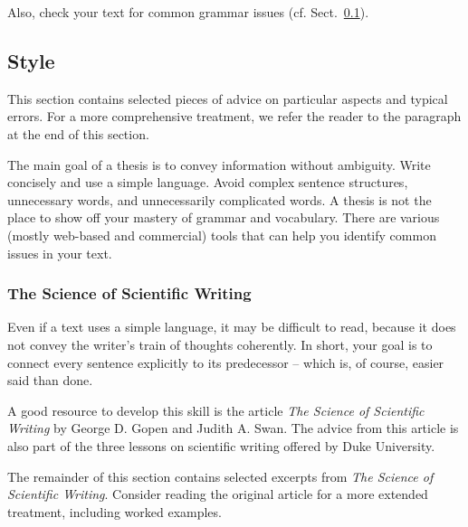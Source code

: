 Also, check your text for common grammar issues (cf. Sect.~\ref{sec:style}).

\subsection{Style}
\label{sec:style}

This section contains selected pieces of advice on particular aspects and typical errors. For a more comprehensive treatment, we refer the reader to the paragraph  at the end of this section.

The main goal of a thesis is to convey information without ambiguity. Write concisely and use a simple language. Avoid complex sentence structures, unnecessary words, and unnecessarily complicated words. A thesis is not the place to show off your mastery of grammar and vocabulary. There are various (mostly web-based and commercial) tools%
that can help you identify common issues in your text.


\subsubsection{The Science of Scientific Writing}

Even if a text uses a simple language, it may be difficult to read, because it does not convey the writer's train of thoughts coherently. In short, your goal is to connect every sentence explicitly to its predecessor – which is, of course, easier said than done.

A good resource to develop this skill is the article \emph{The Science of Scientific Writing} by George D. Gopen and Judith A. Swan. 
The advice from this article is also part of the three lessons on scientific writing offered by Duke University.

The remainder of this section contains selected excerpts from \emph{The Science of Scientific Writing}. Consider reading the original article for a more extended treatment, including worked examples.


